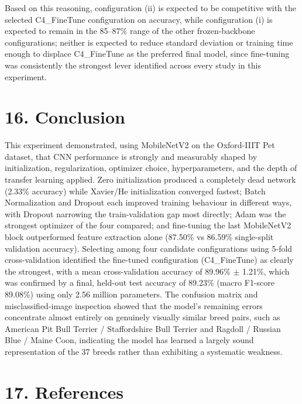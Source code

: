 \documentclass[10pt]{article}
\begin{document}
Based on this reasoning, configuration (ii) is expected to be competitive
with the selected C4\_FineTune configuration on accuracy, while
configuration (i) is expected to remain in the 85--87\% range of the other
frozen-backbone configurations; neither is expected to reduce standard
deviation or training time enough to displace C4\_FineTune as the
preferred final model, since fine-tuning was consistently the strongest
lever identified across every study in this experiment.

\section*{16. Conclusion}

This experiment demonstrated, using MobileNetV2 on the Oxford-IIIT Pet
dataset, that CNN performance is strongly and measurably shaped by
initialization, regularization, optimizer choice, hyperparameters, and the
depth of transfer learning applied. Zero initialization produced a
completely dead network (2.33\% accuracy) while Xavier/He initialization
converged fastest; Batch Normalization and Dropout each improved training
behaviour in different ways, with Dropout narrowing the train-validation
gap most directly; Adam was the strongest optimizer of the four compared;
and fine-tuning the last MobileNetV2 block outperformed feature extraction
alone (87.50\% vs 86.59\% single-split validation accuracy). Selecting
among four candidate configurations using 5-fold cross-validation
identified the fine-tuned configuration (C4\_FineTune) as clearly the
strongest, with a mean cross-validation accuracy of 89.96\% $\pm$ 1.21\%,
which was confirmed by a final, held-out test accuracy of 89.23\% (macro
F1-score 89.08\%) using only 2.56 million parameters. The confusion matrix
and misclassified-image inspection showed that the model's remaining
errors concentrate almost entirely on genuinely visually similar breed
pairs, such as American Pit Bull Terrier / Staffordshire Bull Terrier and
Ragdoll / Russian Blue / Maine Coon, indicating the model has learned a
largely sound representation of the 37 breeds rather than exhibiting a
systematic weakness.

\section*{17. References}
\end{document}
